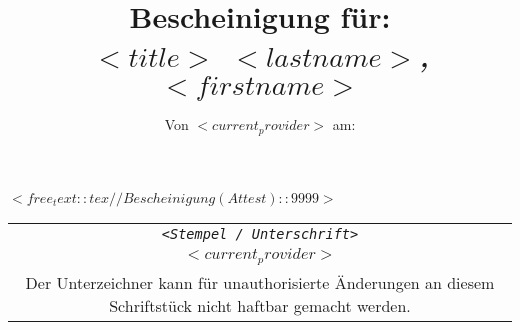 \documentclass[11pt,german]{article}
\begin{document}

\title {Bescheinigung für: \\ \emph {$<title>$ $<lastname>$, $<firstname>$}}
\author {Von $<current_provider>$ am:}
\maketitle 

$<free_text::tex//Bescheinigung (Attest)::9999>$

\begin{tabular}{c}
\rule{0pt}{10ex} \texttt {\textsl {\footnotesize <Stempel / Unterschrift>}}\\
\rule{0pt}{4ex} {\footnotesize $<current_provider>$}\\
\hline
\tiny Der Unterzeichner kann für unauthorisierte Änderungen an diesem Schriftstück nicht haftbar gemacht werden. \\
\end{tabular}
\end{document}
